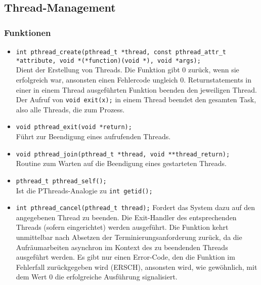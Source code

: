 \documentclass[11pt,a4paper]{article}
\begin{document}
\subsection{Thread-Management}
\subsubsection{Funktionen}
\begin{itemize}
	\item \lstinline$int pthread_create(pthread_t *thread, const pthread_attr_t *attribute, void *(*function)(void *), void *args);$\\
	Dient der Erstellung von Threads. Die Funktion gibt 0 zurück, wenn sie erfolgreich war, ansonsten einen Fehlercode ungleich 0.  Returnstatements in einer in einem Thread ausgeführten Funktion beenden den jeweiligen Thread. Der Aufruf von \lstinline$void exit(x);$ in einem Thread beendet den gesamten Task, also alle Threads, die zum Prozess.

	\item \lstinline$void pthread_exit(void *return);$\\
	Führt zur Beendigung eines aufrufenden Threads.

	\item \lstinline$void pthread_join(pthread_t *thread, void **thread_return);$\\
	Routine zum Warten auf die Beendigung eines gestarteten Threads.

	\item \lstinline$pthread_t pthread_self();$ \\
	Ist die PThreads-Analogie zu \lstinline$int getid();$

	\item \lstinline$int pthread_cancel(pthread_t thread);$
	Fordert das System dazu auf den angegebenen Thread zu beenden. Die Exit-Handler des entsprechenden Threads (sofern eingerichtet) werden ausgeführt. Die Funktion kehrt unmittelbar nach Absetzen der Terminierungsanforderung zurück, da die Aufräumarbeiten asynchron im Kontext des zu beendenden Threads ausgeführt werden. Es gibt nur einen Error-Code, den die Funktion im Fehlerfall zurückgegeben wird (ERSCH), ansonsten wird, wie gewöhnlich, mit dem Wert 0 die erfolgreiche Ausführung signalisiert.
\end{itemize}
\end{document}
